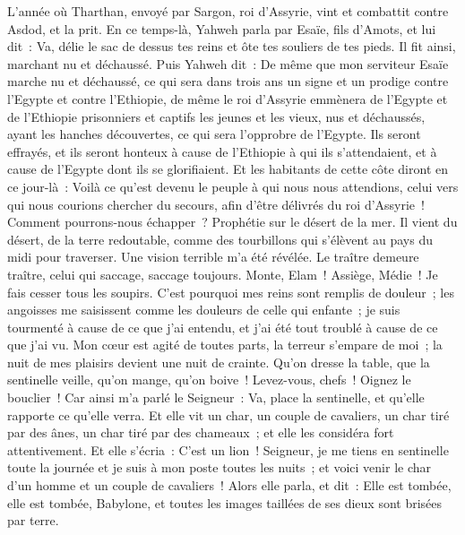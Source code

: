 \begin{multicols}{2}
\VerseOne{}L'année où Tharthan, envoyé par Sargon, roi d'Assyrie, vint et combattit contre Asdod, et la prit.
En ce temps-là, Yahweh parla par Esaïe, fils d'Amots, et lui dit~: Va, délie le sac de dessus tes reins et ôte tes souliers de tes pieds. Il fit ainsi, marchant nu et déchaussé.
Puis Yahweh dit~: De même que mon serviteur Esaïe marche nu et déchaussé, ce qui sera dans trois ans un signe et un prodige contre l'Egypte et contre l'Ethiopie,
de même le roi d'Assyrie emmènera de l'Egypte et de l'Ethiopie prisonniers et captifs les jeunes et les vieux, nus et déchaussés, ayant les hanches découvertes, ce qui sera l'opprobre de l'Egypte.
Ils seront effrayés, et ils seront honteux à cause de l'Ethiopie à qui ils s'attendaient, et à cause de l'Egypte dont ils se glorifiaient.
Et les habitants de cette côte diront en ce jour-là~: Voilà ce qu'est devenu le peuple à qui nous nous attendions, celui vers qui nous courions chercher du secours, afin d'être délivrés du roi d'Assyrie~! Comment pourrons-nous échapper~?
\VerseOne{}Prophétie sur le désert de la mer. Il vient du désert, de la terre redoutable, comme des tourbillons qui s'élèvent au pays du midi pour traverser.
Une vision terrible m'a été révélée. Le traître demeure traître, celui qui saccage, saccage toujours. Monte, Elam~! Assiège, Médie~! Je fais cesser tous les soupirs.
C'est pourquoi mes reins sont remplis de douleur~; les angoisses me saisissent comme les douleurs de celle qui enfante~; je suis tourmenté à cause de ce que j'ai entendu, et j'ai été tout troublé à cause de ce que j'ai vu.
Mon cœur est agité de toutes parts, la terreur s'empare de moi~; la nuit de mes plaisirs devient une nuit de crainte.
Qu'on dresse la table, que la sentinelle veille, qu'on mange, qu'on boive~! Levez-vous, chefs~! Oignez le bouclier~!
Car ainsi m'a parlé le Seigneur~: Va, place la sentinelle, et qu'elle rapporte ce qu'elle verra.
Et elle vit un char, un couple de cavaliers, un char tiré par des ânes, un char tiré par des chameaux~; et elle les considéra fort attentivement.
Et elle s'écria~: C'est un lion~! Seigneur, je me tiens en sentinelle toute la journée et je suis à mon poste toutes les nuits~;
et voici venir le char d'un homme et un couple de cavaliers~! Alors elle parla, et dit~: Elle est tombée, elle est tombée, Babylone, et toutes les images taillées de ses dieux sont brisées par terre.

\end{multicols}
